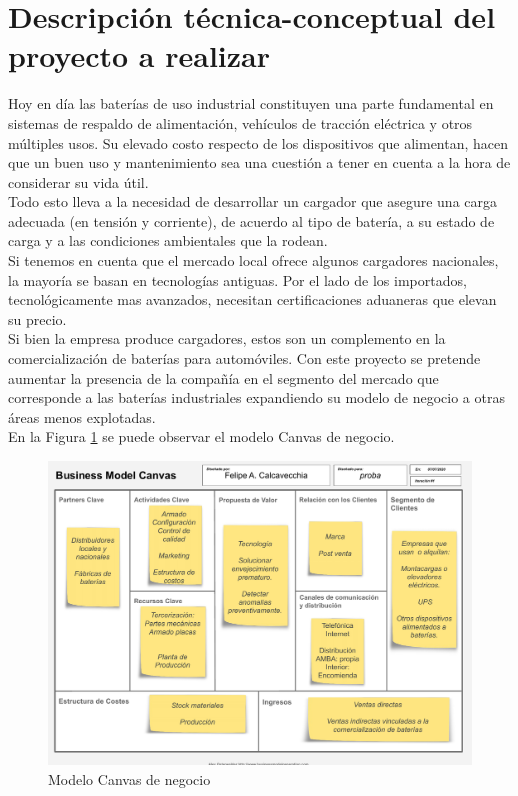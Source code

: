 \documentclass[11pt]{charter}
\begin{document}
\section{Descripción técnica-conceptual del proyecto a realizar}
\label{sec:descripcion}

Hoy en día las baterías de uso industrial constituyen una parte fundamental en sistemas de respaldo de alimentación, vehículos de tracción eléctrica y otros múltiples usos. Su elevado costo respecto de los  dispositivos que alimentan, hacen que un buen uso y mantenimiento sea una cuestión a tener en cuenta a la hora de considerar su vida útil.
\\[3pt]
Todo esto lleva a la necesidad de desarrollar un cargador que asegure una carga adecuada (en tensión y corriente), de acuerdo al tipo de batería, a su estado de carga y a las condiciones ambientales que la rodean.
\\[3pt]
Si tenemos en cuenta que el mercado local ofrece algunos cargadores nacionales, la mayoría se basan en tecnologías antiguas. Por el lado de los importados, tecnológicamente mas avanzados, necesitan certificaciones aduaneras que elevan su precio.
\\[3pt]
Si bien la empresa produce cargadores, estos son un complemento en la comercialización de baterías para automóviles. Con este proyecto se pretende aumentar la presencia de la compañía en el segmento del mercado que corresponde a las baterías industriales expandiendo su modelo de negocio a otras áreas menos explotadas.\\ 
En la Figura \ref{fig:modeloCanvas} se puede observar el modelo Canvas de negocio.

\begin{figure}[h]
\centering 
\includegraphics[width=.9\textwidth]{./Figuras/Canvas1.pdf}
\caption{Modelo Canvas de negocio}
\label{fig:modeloCanvas}
\end{figure}
\end{document}
